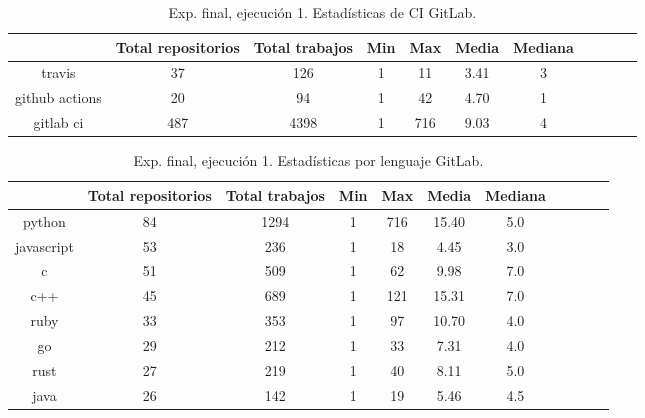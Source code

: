 \begin{table}
  \centering
  \caption{Exp. final, ejecución 1. Estadísticas de CI GitLab.}
  \label{tab:tabla_f1_7}

\begin{footnotesize}
\renewcommand{\arraystretch}{1.5} %
\begin{tabular}{ccccccccccc}
  \hline
  {} &  Total repositorios &  Total trabajos &  Min &  Max &  Media &  Mediana \\
  \hline
  travis         &         37 &         126 &    1 &   11 &   3.41 &        3 \\
  github actions &         20 &          94 &    1 &   42 &   4.70 &        1 \\
  gitlab ci      &        487 &        4398 &    1 &  716 &   9.03 &        4 \\
 \end{tabular}
\end{footnotesize}

\end{table}

\begin{table}
  \centering
  \caption{Exp. final, ejecución 1. Estadísticas por lenguaje GitLab.}
  \label{tab:tabla_f1_8}

\begin{footnotesize}
\renewcommand{\arraystretch}{1.5} %
\begin{tabular}{ccccccccccc}
  \hline
  {} &  Total repositorios &  Total trabajos &  Min &  Max &  Media &  Mediana \\
  \hline
  python           &         84 &        1294 &    1 &  716 &  15.40 &      5.0 \\
  javascript       &         53 &         236 &    1 &   18 &   4.45 &      3.0 \\
  c                &         51 &         509 &    1 &   62 &   9.98 &      7.0 \\
  c++              &         45 &         689 &    1 &  121 &  15.31 &      7.0 \\
  ruby             &         33 &         353 &    1 &   97 &  10.70 &      4.0 \\
  go               &         29 &         212 &    1 &   33 &   7.31 &      4.0 \\
  rust             &         27 &         219 &    1 &   40 &   8.11 &      5.0 \\
  java             &         26 &         142 &    1 &   19 &   5.46 &      4.5 \\
 \end{tabular}
\end{footnotesize}

\end{table}

